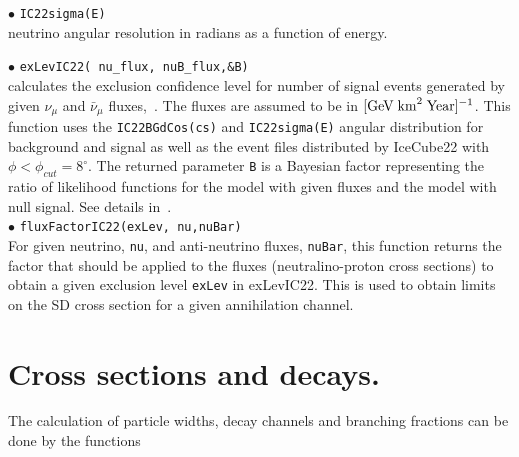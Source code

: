 \documentclass[12pt,a4paper]{article}
\begin{document}
 \noindent 
$\bullet$ \verb|IC22sigma(E)|\\
neutrino angular resolution in radians  as a function of energy. 

\noindent
$\bullet$ \verb|exLevIC22( nu_flux, nuB_flux,&B)|\\
 calculates the  exclusion confidence  level  for number of signal events 
generated by  given $\nu_{\mu}$ and  
$\bar{\nu}_{\mu}$  fluxes,~\cite{Belanger:2015hra}. The fluxes are assumed to be in
$[\rm{GeV\;km}^2\;\rm{Year}]^{-1}$.  This function uses
the \verb|IC22BGdCos(cs)| and \verb|IC22sigma(E)| angular distribution for background and 
signal as well as the event files distributed  by IceCube22 
with  $\phi<\phi_{cut}=8^{\circ} $.  The returned parameter \verb|B| is a
Bayesian  factor representing the ratio of likelihood functions for the  model
with  given fluxes and the model  with null signal.  See details in~\cite{Belanger:2015hra}.\\
\noindent  
$\bullet$ \verb|fluxFactorIC22(exLev, nu,nuBar)|\\
For given neutrino, \verb|nu|, and anti-neutrino fluxes, \verb|nuBar|, 
this function returns the factor that should be applied to the 
fluxes (neutralino-proton   cross sections)  to obtain a given exclusion
level {\tt exLev}  in exLevIC22. This is used to obtain  limits on the SD cross 
section for a given annihilation channel.

\section{Cross sections and decays.}
\label{cross_section}

The calculation of particle widths, decay channels  and branching fractions
can be done by the functions\\
\end{document}
